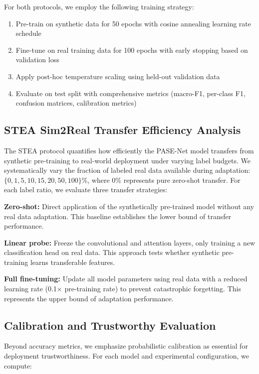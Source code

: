 \documentclass[journal]{IEEEtran}
\begin{document}
For both protocols, we employ the following training strategy:
\begin{enumerate}
\item Pre-train on synthetic data for 50 epochs with cosine annealing learning rate schedule
\item Fine-tune on real training data for 100 epochs with early stopping based on validation loss
\item Apply post-hoc temperature scaling using held-out validation data
\item Evaluate on test split with comprehensive metrics (macro-F1, per-class F1, confusion matrices, calibration metrics)
\end{enumerate}

\subsection{STEA Sim2Real Transfer Efficiency Analysis}

The STEA protocol quantifies how efficiently the PASE-Net model transfers from synthetic pre-training to real-world deployment under varying label budgets. We systematically vary the fraction of labeled real data available during adaptation: $\{0, 1, 5, 10, 15, 20, 50, 100\}\%$, where 0\% represents pure zero-shot transfer. For each label ratio, we evaluate three transfer strategies:

\textbf{Zero-shot:} Direct application of the synthetically pre-trained model without any real data adaptation. This baseline establishes the lower bound of transfer performance.

\textbf{Linear probe:} Freeze the convolutional and attention layers, only training a new classification head on real data. This approach tests whether synthetic pre-training learns transferable features.

\textbf{Full fine-tuning:} Update all model parameters using real data with a reduced learning rate (0.1× pre-training rate) to prevent catastrophic forgetting. This represents the upper bound of adaptation performance.

\subsection{Calibration and Trustworthy Evaluation}

Beyond accuracy metrics, we emphasize probabilistic calibration as essential for deployment trustworthiness. For each model and experimental configuration, we compute:
\end{document}
